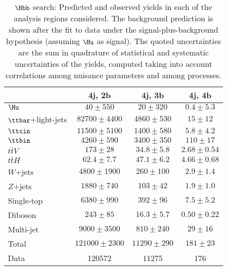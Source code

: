 \begin{table}[htbp]
\caption{
$\Hbb$ search: Predicted and observed yields in each of the analysis regions considered.
The background prediction is shown after the fit to data under the signal-plus-background hypothesis (assuming $\Hu$ as signal).
The quoted uncertainties are the sum in quadrature of statistical and systematic uncertainties of the yields, 
computed taking into account correlations among nuisance parameters and among processes.
}
\small
\begin{center}
\begin{tabular}{l*{3}{c}}
\hline\hline
 & 4j, 2b & 4j, 3b & 4j, 4b \\
\hline
$\Hu$  &   $ 40 \pm 550 $ &   $ 20 \pm 320 $ &   $ 0.4 \pm 5.3 $ \\
\hline
$\ttbar$+light-jets  &   $ 82700 \pm 4400 $ &   $ 4860 \pm 530 $ &   $ 15 \pm 12 $ \\ 
$\ttcin$  &   $ 11500 \pm 5100 $ &   $ 1400 \pm 580 $ &   $ 5.8 \pm 4.2 $ \\ 
$\ttbin$  &   $ 4260 \pm 590 $ &   $ 3400 \pm 350 $ &   $ 110 \pm 17 $ \\ 
$t\bar{t}V$  &   $ 173 \pm 28 $ &   $ 34.8 \pm 5.8 $ &   $ 2.68 \pm 0.54 $ \\ 
$t\bar{t}H$  &   $ 62.4 \pm 7.7 $ &   $ 47.1 \pm 6.2 $ &   $ 4.66 \pm 0.68 $ \\ 
$W$+jets  &   $ 4800 \pm 1900 $ &   $ 260 \pm 100 $ &   $ 2.9 \pm 1.4 $ \\ 
$Z$+jets  &   $ 1880 \pm 740 $ &   $ 103 \pm 42 $ &   $ 1.9 \pm 1.0 $ \\ 
Single-top  &   $ 6380 \pm 990 $ &   $ 392 \pm 96 $ &   $ 7.5 \pm 5.2 $ \\ 
Diboson  &   $ 243 \pm 85 $ &   $ 16.3 \pm 5.7 $ &   $ 0.50 \pm 0.22 $ \\ 
Multi-jet  &   $ 9000 \pm 3500 $ &   $ 810 \pm 240 $ &   $ 29 \pm 16 $ \\ 
\hline
Total &   $ 121000 \pm 2300 $ &   $ 11290 \pm 290 $ &   $ 181 \pm 23 $ \\ 
\hline
Data & 120572  & 11275  & 176  \\ 
\hline\hline      
\end{tabular}
\vspace{0.2cm}


\end{center}
\end{table}
